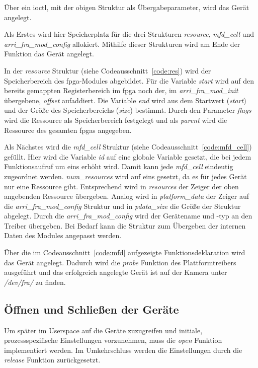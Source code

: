 Über ein \ac{ioctl}, mit der obigen Struktur als Übergabeparameter, wird das Gerät angelegt. 


Als Erstes wird hier Speicherplatz für die drei Strukturen \textit{resource}, \textit{mfd\_cell} und \textit{arri\_fra\_mod\_config} allokiert. Mithilfe dieser Strukturen wird am Ende der Funktion das Gerät angelegt.


In der \textit{resource} Struktur (siehe Codeausschnitt~\ref{code:res}) wird der Speicherbereich des \ac{fpga}-Modules abgebildet. Für die Variable \textit{start} wird auf den bereits gemappten Registerbereich im \ac{fpga} noch der, im \textit{arri\_fra\_mod\_init} übergebene, \textit{offset} aufaddiert. Die Variable \textit{end} wird aus dem Startwert (\textit{start}) und der Größe des Speicherbereichs (\textit{size}) bestimmt. Durch den Parameter \textit{flags} wird die Ressource als Speicherbereich festgelegt und als \textit{parent} wird die Ressource des gesamten \ac{fpga}s angegeben.


Als Nächstes wird die \textit{mfd\_cell} Struktur (siehe Codeausschnitt~\ref{code:mfd_cell}) gefüllt. Hier wird die Variable \textit{id} auf eine globale Variable gesetzt, die bei jedem Funktionsaufruf um eins erhöht wird. Damit kann jede \textit{mfd\_cell} eindeutig zugeordnet werden. \textit{num\_resources} wird auf eins gesetzt, da es für jedes Gerät nur eine Ressource gibt. Entsprechend wird in  \textit{resources} der Zeiger der oben angebenden Ressource übergeben. Analog wird in \textit{platform\_data} der Zeiger auf die \textit{arri\_fra\_mod\_config} Struktur und in \textit{pdata\_size} die Größe der Struktur abgelegt.
Durch die \textit{arri\_fra\_mod\_config} wird der Gerätename und -typ an den Treiber übergeben. Bei Bedarf kann die Struktur zum Übergeben der internen Daten des Modules angepasst werden.

Über die im Codeausschnitt~\ref{code:mfd} aufgezeigte Funktionsdeklaration wird das Gerät angelegt. Dadurch wird die \textit{probe} Funktion des Plattformtreibers ausgeführt und das erfolgreich angelegte Gerät ist auf der Kamera unter \textit{/dev/fra/} zu finden.


\subsection{Öffnen und Schließen der Geräte}
Um später im Userspace auf die Geräte zuzugreifen und initiale, prozessspezifische Einstellungen vorzunehmen, muss die \textit{open} Funktion implementiert werden. Im Umkehrschluss werden die Einstellungen durch die \textit{release} Funktion zurückgesetzt. \cite[Seite 58f.]{corbet2005linux} \\

